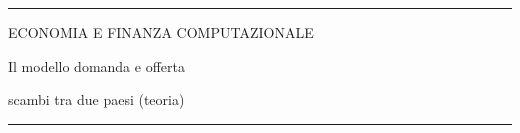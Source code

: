 \documentclass[12pt,aspectratio=169]{beamer}
\begin{document}
\begin{frame}
\begin{center}
\rule{\textwidth}{2pt}

\vskip3mm
ECONOMIA E FINANZA COMPUTAZIONALE

Il modello domanda e offerta

scambi tra due paesi (teoria)
\rule{\textwidth}{2pt}
\end{center}

\end{frame}


\end{document}

